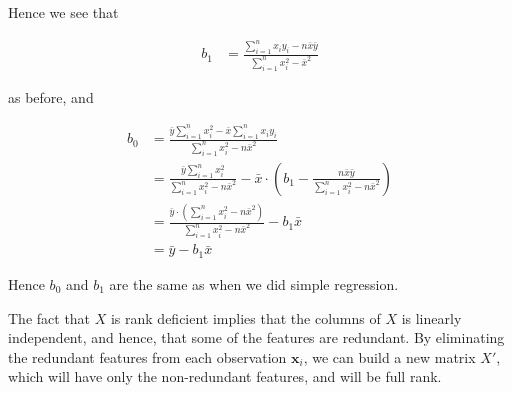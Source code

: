 \documentclass[12pt]{article}
\begin{document}
\begin{enumerate}
Hence we see that

\begin{align*}
	b_1 &= \frac{\sum_{i=1}^{n}x_iy_i-n\bar{x}\bar{y}}{ \sum_{i=1}^{n}x_i^2-\bar{x}^2}
\end{align*}

as before, and

\begin{align*}
	b_0 &= \frac{\bar{y}\sum_{i=1}^{n}x_i^2-\bar{x}\sum_{i=1}^{n}x_iy_i}{\sum_{i=1}^{n}x_i^2-n\bar{x}^2}\\
		&=\frac{\bar{y}\sum_{i=1}^{n}x_i^2}{\sum_{i=1}^{n}x_i^2-n\bar{x}^2}
	-\bar{x}\cdot \left(b_1 - \frac{n\bar{x}\bar{y}}{\sum_{i=1}^{n}x_i^2-n\bar{x}^2}\right)\\
	&=\frac{\bar{y}\cdot \left(\sum_{i=1}^{n}x_i^2-n\bar{x}^2\right)}{\sum_{i=1}^{n}x_i^2-n\bar{x}^2} - b_1\bar{x}\\
	&=\bar{y}-b_1\bar{x}
\end{align*}

Hence $b_0$ and $b_1$ are the same as when we did simple regression.

 

The fact that $X$ is rank deficient implies that the columns of $X$ is linearly independent,
and hence, that some of the features are redundant. By eliminating the redundant features
from each observation $\mathbf{x}_i$, we can build a new matrix $X'$, which will have only
the non-redundant features, and will be full rank.



\end{enumerate}
\end{document}
